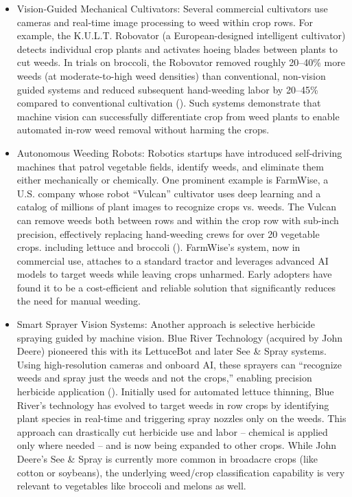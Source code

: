 \documentclass[letterpaper, notitlepage]{report}
\begin{document}
\begin{itemize}

	\item{Vision-Guided Mechanical Cultivators: Several commercial cultivators use cameras and real-time image processing to weed within crop rows. For example, the K.U.L.T. Robovator (a European-designed intelligent cultivator) detects individual crop plants and activates hoeing blades between plants to cut weeds. In trials on broccoli, the Robovator removed roughly 20–40\% more weeds (at moderate-to-high weed densities) than conventional, non-vision guided systems and reduced subsequent hand-weeding labor by 20–45\% compared to conventional cultivation (\cite{Lati2016-lb}). Such systems demonstrate that machine vision can successfully differentiate crop from weed plants to enable automated in-row weed removal without harming the crops.}

	\item{Autonomous Weeding Robots: Robotics startups have introduced self-driving machines that patrol vegetable fields, identify weeds, and eliminate them either mechanically or chemically. One prominent example is FarmWise, a U.S. company whose robot “Vulcan” cultivator uses deep learning and a catalog of millions of plant images to recognize crops vs. weeds. The Vulcan can remove weeds both between rows and within the crop row with sub-inch precision, effectively replacing hand-weeding crews for over 20 vegetable crops. including lettuce and broccoli (\cite{Farmwise2023-pi}). FarmWise’s system, now in commercial use, attaches to a standard tractor and leverages advanced AI models to target weeds while leaving crops unharmed. Early adopters have found it to be a cost-efficient and reliable solution that significantly reduces the need for manual weeding.}

	\item{Smart Sprayer Vision Systems: Another approach is selective herbicide spraying guided by machine vision. Blue River Technology (acquired by John Deere) pioneered this with its LettuceBot and later See \& Spray systems. Using high-resolution cameras and onboard AI, these sprayers can “recognize weeds and spray just the weeds and not the crops,” enabling precision herbicide application (\cite{Bedord2016-fa}). Initially used for automated lettuce thinning, Blue River’s technology has evolved to target weeds in row crops by identifying plant species in real-time and triggering spray nozzles only on the weeds. This approach can drastically cut herbicide use and labor – chemical is applied only where needed – and is now being expanded to other crops. While John Deere’s See \& Spray is currently more common in broadacre crops (like cotton or soybeans), the underlying weed/crop classification capability is very relevant to vegetables like broccoli and melons as well.}


\end{itemize}
\end{document}
